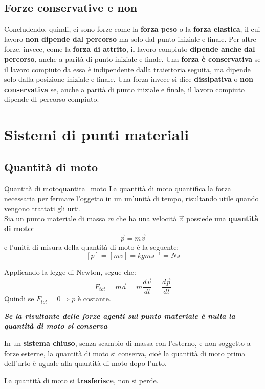 \documentclass[12pt]{report}
\newcounter{definition}
\newcommand{\nmu}{}
\begin{document}
	\section{Forze conservative e non}
		Concludendo, quindi, ci sono forze come la \textbf{forza peso} o la \textbf{forza elastica}, il cui lavoro \textbf{non dipende dal percorso} ma solo dal punto iniziale e finale. Per altre forze, invece, come la \textbf{forza di attrito}, il lavoro compiuto \textbf{dipende anche dal percorso}, anche a parità di punto iniziale e finale.
	Una \textbf{forza è conservativa} se il lavoro compiuto da essa è indipendente dalla traiettoria seguita, ma dipende solo dalla posizione iniziale e finale. Una forza invece si dice \textbf{dissipativa} o \textbf{non conservativa} se, anche a parità di punto iniziale e finale, il lavoro compiuto dipende dl percorso compiuto.
	\chapter{Sistemi di punti materiali}
	\section{Quantità di moto}
	\begin{definition}{\nmu Quantità di moto}{quantita_moto}
		La quantità di moto quantifica la forza necessaria per fermare l'oggetto in un un'unità di tempo, risultando utile quando vengono trattati gli urti. \\
		Sia un punto materiale di massa \textit{m} che ha una velocità $\vec{v}$ possiede una \textbf{quantità di moto}:
		\[
		\vec{p} = m\vec{v}
		\]
		e l'unità di misura della quantità di moto è la seguente:
		\[
		[p] = [mv] = kg m s^{-1} = Ns
		\]
	\end{definition}
	Applicando la legge di Newton, segue che:
	\[
	F_{tot} = m\vec{a} = m\dfrac{d\vec{v}}{dt} = \dfrac{d\vec{p}}{dt}
	\]
	Quindi se $F_{tot} = 0 \Rightarrow p$ è costante.
	\begin{center}
		\textbf{\textit{Se la risultante delle forze agenti sul punto materiale è nulla la quantità di moto si conserva}}
	\end{center}
	In un \textbf{sistema chiuso}, senza scambio di massa con l'esterno, e non soggetto a forze esterne, la quantità di moto si conserva, cioè la quantità di moto prima dell'urto è uguale alla quantità di moto dopo l'urto.
	\begin{note}{}{}
		La quantità di moto si \textbf{trasferisce}, non si perde.
	\end{note}
\end{document}
